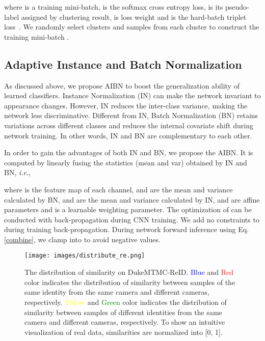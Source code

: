 \documentclass[final]{cvpr}
\begin{document}
where  is a training mini-batch,  is the softmax cross entropy loss,  is its pseudo-label assigned by clustering result,  is loss weight and  is the hard-batch triplet loss~\cite{triplet}. We randomly select  clusters and  samples from each cluster to construct the training mini-batch .


\subsection{Adaptive Instance and Batch Normalization}\label{AIBN}

As discussed above, we propose AIBN to boost the generalization ability of learned classifiers. Instance Normalization (IN) \cite{IN} can make the network invariant to appearance changes. However, IN reduces the inter-class variance, making the network less discriminative. Different from IN, Batch Normalization (BN) \cite{BN} retains variations across different classes and reduces the internal covariate shift during network training. In other words, IN and BN are complementary to each other.

In order to gain the advantages of both IN and BN, we propose the AIBN. It is computed by linearly fusing the statistics (mean and var) obtained by IN and BN, \emph{i.e.},

where  is the feature map of each channel,  and  are the mean and variance calculated by BN,  and  are the mean and variance calculated by IN,  and  are affine parameters and  is a learnable weighting parameter. The optimization of  can be conducted with back-propagation during CNN training. We add no constraints to  during training back-propagation. During network forward inference using Eq. \eqref{combine}, we clamp  into  to avoid negative values.



\begin{figure}
	\centering
	\texttt{[image: images/distribute\_re.png]}
	\vspace{-4mm}
	\caption{The distribution of similarity on DukeMTMC-ReID. \textcolor{blue}{Blue} and \textcolor{red}{Red} color indicates the distribution of similarity between samples of the same identity from the same camera and different cameras, respectively. \textcolor{yellow}{Yellow} and \textcolor{green}{Green} color indicates the distribution of similarity between samples of different identities from the same camera and different cameras, respectively. To show an intuitive visualization of real data, similarities are normalized into [0, 1].}
	\label{distribute}
\end{figure}
\end{document}
